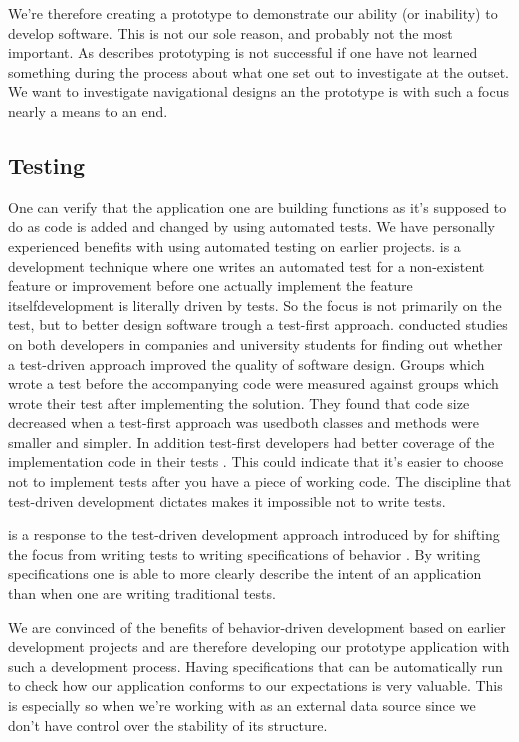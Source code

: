 We're therefore creating a prototype to demonstrate our ability (or inability)
to develop software. This is not our sole reason, and probably not the most
important. As \citet[]{mayhew90} describes prototyping is not
successful if one have not learned something during the process about what one
set out to investigate at the outset. We want to investigate navigational
designs an the prototype is with such a focus nearly a means to an end.

\subsection{Testing}
\label{section:implementation.process.testing}

One can verify that the application one are building functions as it's
supposed to do as code is added and changed by using automated tests.
We have personally experienced benefits with using automated testing on
earlier projects.
 is a development technique
where one writes an automated test for a non-existent feature or
improvement before one actually implement the feature itself\dash{}development
is literally driven by tests. So the focus is not primarily on the test, but
to better design software trough a test-first approach.
\citet{janzen08} conducted studies
on both developers in companies and university students for finding out
whether a test-driven approach improved the quality of software design.
Groups which wrote a test before the accompanying code were measured
against groups which wrote their test after implementing the solution.
They found that code size decreased when a test-first approach was
used\dash{}both classes and methods were smaller and simpler. In addition
test-first developers had better coverage of the implementation code in
their tests \citep[]{janzen08}. This could indicate that it's
easier to choose not to implement tests after you have a piece
of working code. The discipline that test-driven development dictates
makes it impossible not to write tests.

 is a response to the test-driven
development approach introduced by \citeauthor{north06} for shifting the focus
from writing tests to writing specifications of behavior
\citep{north06}. By writing specifications one is able to
more clearly describe the intent of an application than when one
are writing traditional tests.

We are convinced of the benefits of behavior-driven development based on
earlier development projects and are therefore developing our
prototype application with such a development process. Having specifications
that can be automatically run to check how our application conforms to our
expectations is very valuable. This is especially so when we're working
with \urort{} as an external data source since we don't have control over
the stability of its structure.

